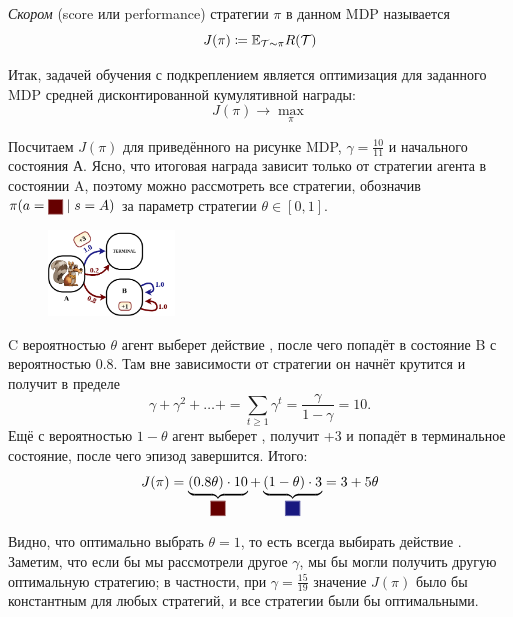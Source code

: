 \begin{definition}
\emph{Скором} (score или performance) стратегии $\pi$ в данном MDP называется
\begin{equation}\label{goal}
J(\pi) \coloneqq \mathbb{E}_{\mathcal{T} \sim \pi} R(\mathcal{T})
\end{equation}
\end{definition}

Итак, задачей обучения с подкреплением является оптимизация для заданного MDP средней дисконтированной кумулятивной награды:
\begin{equation*}
J(\pi) \to \max_{\pi}
\end{equation*}

\begin{exampleBox}[label=ex:score]{}
Посчитаем $J(\pi)$ для приведённого на рисунке MDP, $\gamma = \frac{10}{11}$ и начального состояния А. Ясно, что итоговая награда зависит только от стратегии агента в состоянии A, поэтому можно рассмотреть все стратегии, обозначив $\pi(a = \text{\colorsquare{ChadRed}} \mid s = A)$ за параметр стратегии $\theta \in [0, 1]$.

\begin{figure}
\centering
\includegraphics[width=0.3\textwidth]{Images/Score.png}
\vspace{-1cm}
\end{figure}

C вероятностью $\theta$ агент выберет действие , после чего попадёт в состояние B с вероятностью 0.8. Там вне зависимости от стратегии он начнёт крутится и получит в пределе
$$\gamma + \gamma^2 + \dots + = \sum\limits_{t \ge 1} \gamma^t = \frac{\gamma}{1 - \gamma} = 10.$$
Ещё с вероятностью $1 - \theta$ агент выберет , получит +3 и попадёт в терминальное состояние, после чего эпизод завершится. Итого:
$$J(\pi) = \underbrace{\left( 0.8\theta \right) \cdot 10}_{\text{\colorsquare{ChadRed}}} + \underbrace{\left(1 - \theta \right) \cdot 3}_{\text{\colorsquare{ChadBlue}}} = 3 + 5\theta$$

Видно, что оптимально выбрать $\theta = 1$, то есть всегда выбирать действие . Заметим, что если бы мы рассмотрели другое $\gamma$, мы бы могли получить другую оптимальную стратегию; в частности, при $\gamma = \frac{15}{19}$ значение $J(\pi)$ было бы константным для любых стратегий, и все стратегии были бы оптимальными. 
\end{exampleBox}

